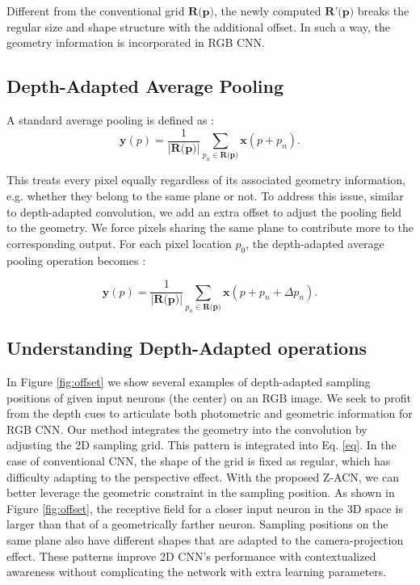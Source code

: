 \documentclass[lettersize,journal]{IEEEtran}
\begin{document}
Different from the conventional grid $\textbf{R(p)}$, the newly computed $\textbf{R'(p)}$ breaks the regular size and shape structure with the additional offset. In such a way, the geometry information is incorporated in RGB CNN. 

\subsection{Depth-Adapted Average Pooling}

A standard average pooling is defined as :
\begin{equation}
   \textbf{y}(p) = \frac{1}{|\textbf{R(p)}|}\sum_{p_n\in\textbf{R(p)}} \textbf{x}(p + p_n). 
   \label{eq:avgpool}
\end{equation}



This treats every pixel equally regardless of its associated geometry information, e.g. whether they belong to the same plane or not. To address this issue, similar to depth-adapted convolution, we add an extra offset to adjust the pooling field to the geometry. We force pixels sharing the same plane to contribute more to the corresponding output. For each pixel location $p_0$, the depth-adapted average pooling operation becomes :

\begin{equation}
   \textbf{y}(p) = \frac{1}{|\textbf{R(p)}|}\sum_{p_n\in\textbf{R(p)}} \textbf{x}(p + p_n + \Delta p_n). 
   \label{eq:adaptedavgpool}
\end{equation}



\subsection{Understanding Depth-Adapted operations}

In Figure \ref{fig:offset} we show several examples of depth-adapted sampling positions of given input neurons (the center) on an RGB image. We seek to profit from the depth cues to articulate both photometric and geometric information for RGB CNN. Our method integrates the geometry into the convolution by adjusting the 2D sampling grid. This pattern is integrated into Eq. \ref{eq}. In the case of conventional CNN, the shape of the grid is fixed as regular, which has difficulty adapting to the perspective effect. With the proposed Z-ACN, we can better leverage the geometric constraint in the sampling position. As shown in Figure \ref{fig:offset}, the receptive field for a closer input neuron in the 3D space is larger than that of a geometrically farther neuron. Sampling positions on the same plane also have different shapes that are adapted to the camera-projection effect. These patterns improve 2D CNN's performance with contextualized awareness without complicating the network with extra learning parameters.
\end{document}
